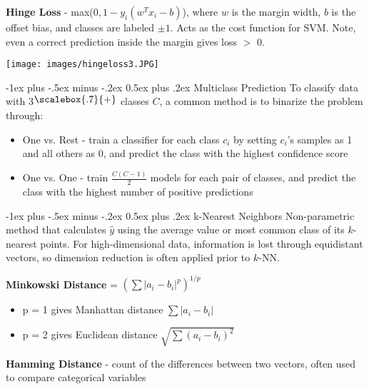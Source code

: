 \documentclass[10pt,landscape]{article}
\makeatletter
\newcommand{\plus}{\raisebox{.3\height}{\scalebox{.7}{+}}}
\renewcommand{\section}{\@startsection{section}{1}{0mm}%
                                {-1ex plus -.5ex minus -.2ex}%
                                {0.5ex plus .2ex}%
                                {\normalfont\large\bfseries}}
\renewcommand{\subsection}{\@startsection{subsection}{2}{0mm}%
                                {-1ex plus -.5ex minus -.2ex}%
                                {0.5ex plus .2ex}%
                                {\normalfont\normalsize\bfseries}}
\makeatother
\begin{document}
\begin{multicols}{3}
\textbf{Hinge Loss} - max($0,1-y_i(w^T x_i - b)$), where
$w$ is the margin width, $b$ is the offset bias, and classes are labeled $\pm1$. Acts as the cost function for SVM. Note, even a correct prediction inside the margin gives loss $>$ 0.
\vspace{-1mm}
\begin{center}
    \texttt{[image: images/hingeloss3.JPG]}
\end{center}
\vspace{-3.5mm}
\subsection{Multiclass Prediction}
To classify data with 3$\plus$ classes $C$, a common method is to binarize the problem through:
\begin{itemize}[label={--},leftmargin=4mm]
\vspace{-1mm}
\itemsep -.4mm
\item One vs. Rest - train a classifier for each class $c_i$ by setting $c_i$'s samples as 1 and all others as 0, and predict the class with the highest confidence score
\item One vs. One - train $\frac{C (C-1)}{2}$ models for each pair of classes, and predict the class with the highest number of positive predictions
\end{itemize}

\section{k-Nearest Neighbors}
Non-parametric method that calculates $\hat{y}$ using the average value or most common class of its $k$-nearest points. For high-dimensional data, information is lost through equidistant vectors, so dimension reduction is often applied prior to $k$-NN.

\textbf{Minkowski Distance} = $(\sum|a_i - b_i|^p)^{1/p}$
\begin{itemize}[label={--},leftmargin=4mm]
\itemsep -.4mm
\item p = 1 gives Manhattan distance ${\sum|a_i - b_i|}$
\item p = 2 gives Euclidean distance $\sqrt{\sum(a_i - b_i)^2}$
\end{itemize}

\textbf{Hamming Distance} - count of the differences between two vectors, often used to compare categorical variables \\


\end{multicols}
\end{document}
